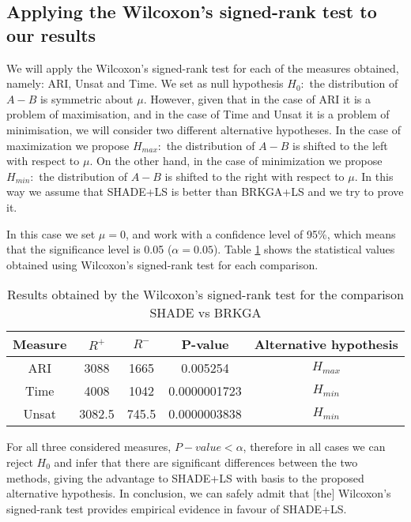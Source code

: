 
\subsection{Applying the Wilcoxon's signed-rank test to our results}

We will apply the Wilcoxon's signed-rank test for each of the measures obtained, namely: ARI, Unsat and Time. We set as null hypothesis $H_0: $ the distribution of $A - B$ is symmetric about $\mu$. However, given that in the case of ARI it is a problem of maximisation, and in the case of Time and Unsat it is a problem of minimisation, we will consider two different alternative hypotheses. In the case of maximization we propose $H_{max}:$ the distribution of $A - B$ is shifted to the left with respect to $\mu$. On the other hand, in the case of minimization we propose $H_{min}:$ the distribution of $A - B$ is shifted to the right with respect to $\mu$. In this way we assume that SHADE+LS is better than BRKGA+LS and we try to prove it.

In this case we set $\mu = 0$, and work with a confidence level of 95\%, which means that the significance level is 0.05 ($\alpha = 0.05$). Table \ref{tab:freqTest} shows the statistical values obtained using Wilcoxon's signed-rank test for each comparison.

\begin{table}[!htp]
	\centering
	\setlength{\tabcolsep}{7pt}
	\renewcommand{\arraystretch}{1.4}
	\begin{tabular}{ccccc}
		\hline
		Measure & $R^{+}$ & $R^{-}$ & P-value & Alternative hypothesis  \\
		\hline
		ARI & 3088 & 1665 & 0.005254 & $H_{max}$ \\
		Time & 4008 & 1042 & 0.0000001723 & $H_{min}$ \\
		Unsat & 3082.5 & 745.5 & 0.0000003838 & $H_{min}$ \\
		\hline
	\end{tabular}
	\caption{Results obtained by the Wilcoxon's signed-rank test for the comparison SHADE vs BRKGA}
	\label{tab:freqTest}
\end{table}

For all three considered measures, $P-value < \alpha$, therefore in all cases we can reject $H_0$ and infer that there are significant differences between the two methods, giving the advantage to SHADE+LS with basis to the proposed alternative hypothesis. In conclusion, we can safely admit that [the] Wilcoxon's signed-rank test provides empirical evidence in favour of SHADE+LS.